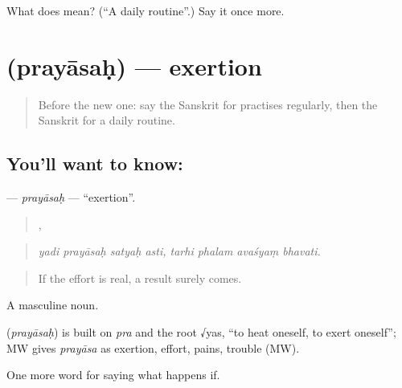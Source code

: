 \begin{tcolorbox}[breakable,colback=teal!4,colframe=teal!35!black,title={Before you move on}]
What does  mean? (\textquotedblleft{}A daily routine\textquotedblright{}.) Say it once more.
\end{tcolorbox}
\section[\texorpdfstring{\sk{प्रयासः} (prayāsaḥ)}{प्रयासः (prayāsaḥ)}]{ (prayāsaḥ) — exertion}

\label{lesson:SA-C552-prayasah}



\begin{quote}
Before the new one: say the Sanskrit for practises regularly, then the Sanskrit for a daily routine.
\end{quote}

\subsection*{You'll want to know: }
\textbf{} — \emph{prayāsaḥ} — \textquotedblleft{}exertion\textquotedblright{}.

\begin{quote}
   ,    
\end{quote}

\begin{quote}
\emph{yadi prayāsaḥ satyaḥ asti, tarhi phalam avaśyaṃ bhavati.}
\end{quote}

\begin{quote}
If the effort is real, a result surely comes.
\end{quote}

A masculine noun.

\begin{cousinweb}
\textbf{} (\emph{prayāsaḥ}) is built on \emph{pra} and the root √yas, \textquotedblleft{}to heat oneself, to exert oneself\textquotedblright{}; MW gives \emph{prayāsa} as exertion, effort, pains, trouble (MW).
\end{cousinweb}

\begin{grammarlens}[title={What you've built}]
One more word for saying what happens if.
\end{grammarlens}

